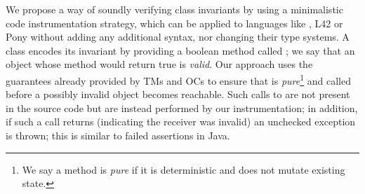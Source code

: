 









\loseSpace
We propose a way of soundly verifying class invariants by using a minimalistic code instrumentation strategy, which can be applied to languages like , L42 or Pony without adding any additional syntax, nor changing their type systems.
 A class encodes its invariant by providing a boolean method called \Q@invariant@; we say that an object whose \Q@invariant@ method would return true is \emph{valid}. Our approach uses the guarantees already provided by TMs and OCs to ensure that \Q@invariant@ is \emph{pure}\footnote{We say a method is \emph{pure} if it is deterministic and does not mutate existing state.} and called before a possibly invalid object becomes reachable. Such calls to \Q@invariant@ are not present in the source code but are instead performed by our instrumentation; in addition, if such a call returns \Q@false@ (indicating the receiver was invalid) an unchecked exception is thrown; this is similar to failed assertions in Java.

